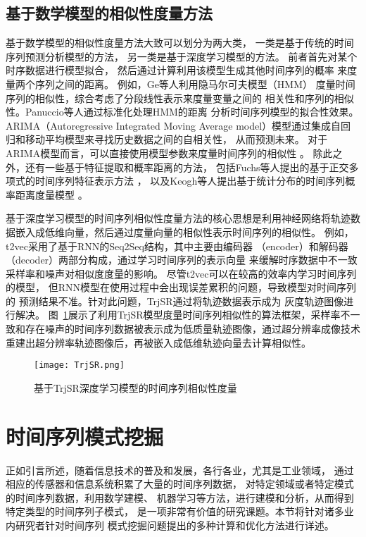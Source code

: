 \subsection{基于数学模型的相似性度量方法}
基于数学模型的相似性度量方法大致可以划分为两大类，
一类是基于传统的时间序列预测分析模型的方法，
另一类是基于深度学习模型的方法。
前者首先对某个时序数据进行模型拟合，
然后通过计算利用该模型生成其他时间序列的概率
来度量两个序列之间的距离。
例如，Ge等人利用隐马尔可夫模型（HMM）\cite{DBLP:conf/kdd/GeS00}
度量时间序列的相似性，综合考虑了分段线性表示来度量变量之间的
相关性和序列的相似性。Panuccio等人通过标准化处理HMM的距离
分析时间序列模型的拟合性效果\cite{DBLP:conf/sspr/PanuccioBM02}。
ARIMA（Autoregressive Integrated Moving Average model）模型通过集成自回归和移动平均模型来寻找历史数据之间的自相关性，
从而预测未来\cite{DBLP:conf/aaai/LiuHZS16}。
对于ARIMA模型而言，可以直接使用模型参数来度量时间序列的相似性
\cite{DBLP:conf/icdm/KalpakisGP01}。
除此之外，还有一些基于特征提取和概率距离的方法，
包括Fuchs等人提出的基于正交多项式的时间序列特征表示方法
\cite{DBLP:journals/ijon/FuchsGPS10}，
以及Keogh等人提出基于统计分布的时间序列概率距离度量模型
\cite{DBLP:conf/kdd/KeoghS97}。

基于深度学习模型的时间序列相似性度量方法的核心思想是利用神经网络将轨迹数据嵌入成低维向量，然后通过度量向量的相似性表示时间序列的相似性。
例如，t2vec采用了基于RNN的Seq2Seq结构，其中主要由编码器
（encoder）和解码器（decoder）两部分构成，通过学习时间序列的表示向量
来缓解时序数据中不一致采样率和噪声对相似度度量的影响\cite{DBLP:conf/icde/LiZCJW18}。
尽管t2vec可以在较高的效率内学习时间序列的模型，
但RNN模型在使用过程中会出现误差累积的问题，导致模型对时间序列的
预测结果不准。针对此问题，TrjSR通过将轨迹数据表示成为
灰度轨迹图像进行解决\cite{DBLP:conf/ijcnn/CaoTWWX21}。
图~\ref{fig:TrjSR}展示了利用TrjSR模型度量时间序列相似性的算法框架，采样率不一致和存在噪声的时间序列数据被表示成为低质量轨迹图像，通过超分辨率成像技术重建出超分辨率轨迹图像后，再被嵌入成低维轨迹向量去计算相似性。
\begin{figure}
  \centering
  \texttt{[image: TrjSR.png]}
  \caption{基于TrjSR深度学习模型的时间序列相似性度量}
  \label{fig:TrjSR}
\end{figure}

\section{时间序列模式挖掘}
正如引言所述，随着信息技术的普及和发展，各行各业，尤其是工业领域，
通过相应的传感器和信息系统积累了大量的时间序列数据，
对特定领域或者特定模式的时间序列数据，利用数学建模、
机器学习等方法，进行建模和分析，从而得到特定类型的时间序列子模式，
是一项非常有价值的研究课题。本节将针对诸多业内研究者针对时间序列
模式挖掘问题提出的多种计算和优化方法进行详述。

